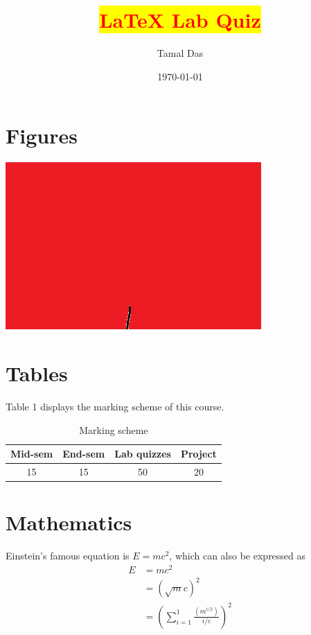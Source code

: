 \documentclass{article}
\begin{document}
\title{\colorbox{yellow}{\textbf{\textcolor{red}{\LaTeX{} Lab Quiz}}}}
\author{Tamal Das}
\date{\today}

\maketitle


\tableofcontents

\listoffigures

\listoftables

\section{Figures} \label{figures}


  \begin{center}
    \includegraphics{iitdhlogo}
  \end{center}


\section{Tables}

\begin{table}[h!]
\centering
Table 1 displays the marking scheme of this course.
\begin{tabular}{||c| c| c| c||}
\hline
Mid-sem & End-sem & Lab quizzes & Project \\ 
\hline
15 & 15 & 50 & 20 \\
\hline
\end{tabular}
\caption{Marking scheme}
\label{table:1}
\end{table}


\section{Mathematics}
Einstein’s famous equation is $ E = mc^2 $, which can also be expressed as
\begin{equation} \label{eq1}
\begin{split}
E & = mc^2 \\
& = (\sqrt{m}c)^2\\
& = \left( \sum_{i=1}^{1} \frac{(m^{i/2})}{i/c} \right)^2
\end{split}
\end{equation}
\end{document}

